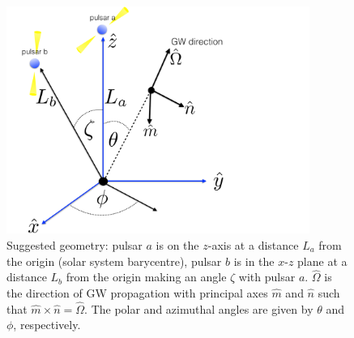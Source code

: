 \documentclass[article, onecolumn, ,nofootinbib,nopreprintnumbers]{revtex4}
\begin{document}

\begin{figure}[b]
		\centering
		\includegraphics[width=3.9in]{pta_geometry.pdf}
		\caption[Typical pulsar timing array geometry]{Suggested geometry: pulsar $a$ is on the $z$-axis at a distance $L_a$ from the origin (solar system barycentre), pulsar $b$ is in the $x$-$z$ plane at a distance $L_b$ from the origin making an angle $\zeta$ with pulsar $a$. $\hat\Omega$ is the direction of GW propagation with principal axes $\hat m$ and $\hat n$ such that  $\hat m \times \hat n =\hat\Omega$. The polar and azimuthal angles are given by $\theta$ and $\phi$, respectively.}
		\label{fig:geometry}
	\end{figure}
\end{document}
